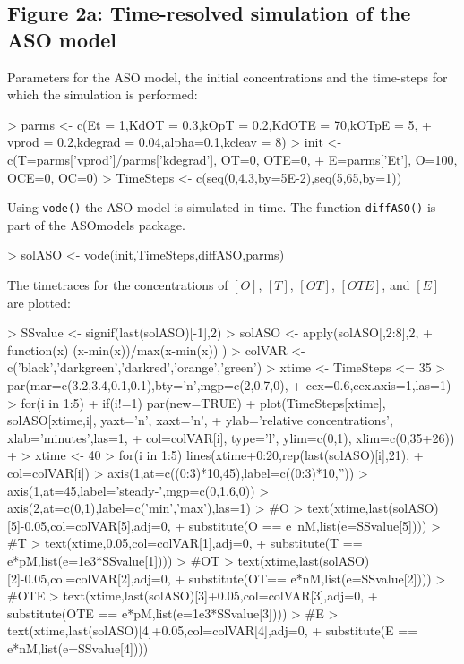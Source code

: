\documentclass{article}
\begin{document}
\subsection*{Figure 2a: Time-resolved simulation of the ASO model}
Parameters for the ASO model, the initial concentrations and the time-steps for which the simulation is performed:
\begin{Schunk}
\begin{Sinput}
> parms <- c(Et = 1,KdOT = 0.3,kOpT = 0.2,KdOTE = 70,kOTpE = 5,  
+            vprod = 0.2,kdegrad = 0.04,alpha=0.1,kcleav = 8)
> init <- c(T=parms['vprod']/parms['kdegrad'], OT=0, OTE=0, 
+           E=parms['Et'], O=100, OCE=0, OC=0)
> TimeSteps <- c(seq(0,4.3,by=5E-2),seq(5,65,by=1))
\end{Sinput}
\end{Schunk}
Using \texttt{vode()} the ASO model is simulated in time. The function \texttt{diffASO()} is part of the ASOmodels package. 
\begin{Schunk}
\begin{Sinput}
> solASO <- vode(init,TimeSteps,diffASO,parms)
\end{Sinput}
\end{Schunk}
The timetraces for the concentrations of $[O]$, $[T]$, $[OT]$, $[OTE]$, and $[E]$ are plotted:
\begin{Schunk}
\begin{Sinput}
> SSvalue <- signif(last(solASO)[-1],2)
> solASO <- apply(solASO[,2:8],2,
+                 function(x) (x-min(x))/max(x-min(x)) )
> colVAR <- c('black','darkgreen','darkred','orange','green')
> xtime <- TimeSteps <= 35
> par(mar=c(3.2,3.4,0.1,0.1),bty='n',mgp=c(2,0.7,0),
+     cex=0.6,cex.axis=1,las=1)
> for(i in 1:5){ 
+   if(i!=1) par(new=TRUE)
+   plot(TimeSteps[xtime], solASO[xtime,i], yaxt='n', xaxt='n',
+        ylab='relative concentrations', xlab='minutes',las=1, 
+        col=colVAR[i], type='l', ylim=c(0,1), xlim=c(0,35+26))
+ }
> xtime <- 40
> for(i in 1:5) lines(xtime+0:20,rep(last(solASO)[i],21),
+                     col=colVAR[i])
> axis(1,at=c((0:3)*10,45),label=c((0:3)*10,''))
> axis(1,at=45,label='steady-\nstate',mgp=c(0,1.6,0))
> axis(2,at=c(0,1),label=c('min','max'),las=1)
> #O
> text(xtime,last(solASO)[5]-0.05,col=colVAR[5],adj=0,
+      substitute(O == e~nM,list(e=SSvalue[5])))
> #T
> text(xtime,0.05,col=colVAR[1],adj=0,
+      substitute(T == e*pM,list(e=1e3*SSvalue[1])))
> #OT
> text(xtime,last(solASO)[2]-0.05,col=colVAR[2],adj=0,
+      substitute(OT== e*nM,list(e=SSvalue[2])))
> #OTE
> text(xtime,last(solASO)[3]+0.05,col=colVAR[3],adj=0,
+      substitute(OTE == e*pM,list(e=1e3*SSvalue[3])))
> #E
> text(xtime,last(solASO)[4]+0.05,col=colVAR[4],adj=0,
+      substitute(E == e*nM,list(e=SSvalue[4])))
\end{Sinput}
\end{Schunk}
\end{document}
